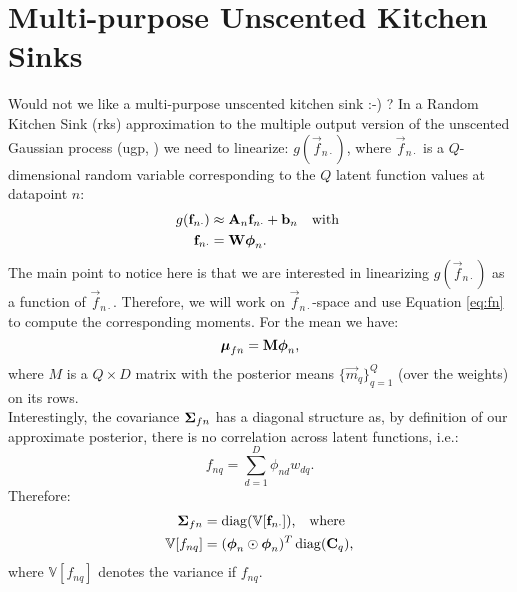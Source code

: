 \documentclass[11pt,a4paper]{article}
\newcommand{\m}{\vec{m}}
\renewcommand{\Q}{Q}
\newcommand{\rks}{{\sc rks}}
\newcommand{\ugp}{{\sc ugp}}
\newcommand{\f}{\vec{f}}
\newcommand{\fn}{\f_{n \cdot}}
\newcommand{\An}{\mat{A}_n}
\newcommand{\bn}{\vec{b}_n}
\renewcommand{\W}{\mat{W}}
\newcommand{\phin}{\vecS{\phi}_n}
\newcommand{\mufn}{\vecS{\mu}_{fn}}
\newcommand{\Sigmafn}{\mat{\Sigma}_{fn}}
\newcommand{\M}{\mat{M}}
\renewcommand{\D}{D}
\newcommand{\fnq}{f_{nq}}
\newcommand{\var}[1]{\mathbb{V}[#1]}
\begin{document}
%
\section{Multi-purpose Unscented Kitchen Sinks}
Would not we like a multi-purpose unscented kitchen sink :-) ? In a Random Kitchen Sink (\rks)
approximation to the multiple output version of the unscented Gaussian process (\ugp, ) we need to linearize: $g(\fn)$, where $\fn$ is a $\Q$-dimensional random variable corresponding to the $\Q$ latent function values at datapoint $n$:
\begin{align}
	g(\fn) & \approx \An \fn + \bn \quad \text{with }\\
	\label{eq:fn}
\fn &=  \W \phin \text{.}
\end{align}
The main point to notice here is that we are interested in linearizing $g(\fn)$ as a function of $\fn$. 
Therefore, we will work on $\fn$-space and use Equation \eqref{eq:fn} to compute the corresponding
moments. For the mean we have:
\begin{equation}
	\mufn = \M \phin \text{,}
\end{equation}
where $M$ is a $\Q \times \D$  matrix with the posterior means $\{ \m_q\}_{q=1}^{Q}$ (over 
the weights) on its rows. \\

Interestingly, the covariance $\Sigmafn$ has a diagonal structure as, by definition of our 
approximate posterior, there is no correlation across latent functions, i.e.:
\begin{equation}
	\fnq = \sum_{d=1}^{\D} \phi_{nd} w_{dq} \text{.}
\end{equation}
Therefore:
\begin{align}
	\Sigmafn &= \diag(\var{\fn}) \text{,} \quad \text{where } \\
	\label{eq:var-fnq}
	\var{\fnq} & = (\phin \hada \phin)^T \diag(\C_q)  \text{,}
\end{align}
where $\var{\fnq}$ denotes the variance if $\fnq$. \\
\end{document}
